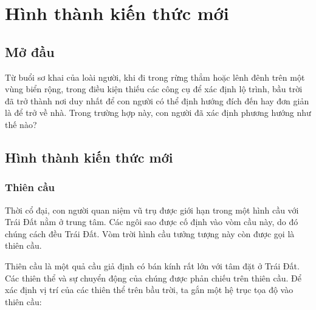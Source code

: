 \setcounter{section}{0}
\section{Hình thành kiến thức mới}

\subsection{Mở đầu}
Từ buổi sơ khai của loài người, khi đi trong rừng thẳm hoặc lênh đênh trên một vùng biển rộng, trong điều kiện thiếu các công cụ để xác định lộ trình, bầu trời đã trở thành nơi duy nhất để con người có thể định hướng đích đến hay đơn giản là để trở về nhà. Trong trường hợp này, con người đã xác định phương hướng như thế nào?
\subsection{Hình thành kiến thức mới}
\subsubsection{Thiên cầu}
Thời cổ đại, con người quan niệm vũ trụ được giới hạn trong một hình cầu với Trái Đất nằm ở trung tâm. Các ngôi sao được cố định vào vòm cầu này, do đó chúng cách đều Trái Đất. Vòm trời hình cầu tưởng tượng này còn được gọi là thiên cầu.

Thiên cầu là một quả cầu giả định có bán kính rất lớn với tâm đặt ở Trái Đất. Các thiên thể và sự chuyển động của chúng được phản chiếu trên thiên cầu. Để xác định vị trí của các thiên thể trên bầu trời, ta gắn một hệ trục tọa độ vào thiên cầu:

